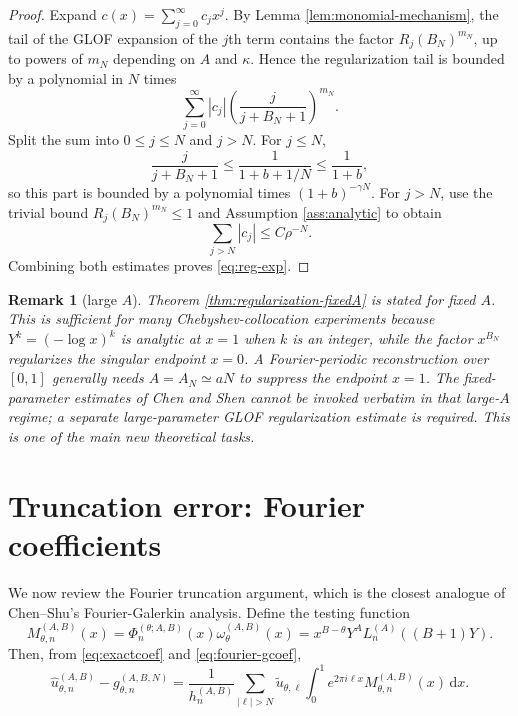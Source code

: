 \documentclass[11pt]{article}
\newtheorem{remark}{Remark}
\newcommand{\dd}{\,\mathrm{d}}
\newcommand{\Lag}{L}
\begin{document}
\begin{proof}
Expand $c(x)=\sum_{j=0}^\infty c_jx^j$.  By Lemma \ref{lem:monomial-mechanism}, the tail of the GLOF expansion of the $j$th term contains the factor $R_j(B_N)^{m_N}$, up to powers of $m_N$ depending on $A$ and $\kappa$.  Hence the regularization tail is bounded by a polynomial in $N$ times
\[
    \sum_{j=0}^\infty |c_j|\left(\frac{j}{j+B_N+1}\right)^{m_N}.
\]
Split the sum into $0\le j\le N$ and $j>N$.  For $j\le N$,
\[
    \frac{j}{j+B_N+1}\le \frac{1}{1+b+1/N}\le \frac{1}{1+b},
\]
so this part is bounded by a polynomial times $(1+b)^{-\gamma N}$.  For $j>N$, use the trivial bound $R_j(B_N)^{m_N}\le1$ and Assumption \ref{ass:analytic} to obtain
\[
    \sum_{j>N}|c_j|\le C\rho^{-N}.
\]
Combining both estimates proves \eqref{eq:reg-exp}.
\end{proof}

\begin{remark}[large $A$]
Theorem \ref{thm:regularization-fixedA} is stated for fixed $A$.  This is sufficient for many Chebyshev-collocation experiments because $Y^k=(-\log x)^k$ is analytic at $x=1$ when $k$ is an integer, while the factor $x^{B_N}$ regularizes the singular endpoint $x=0$.  A Fourier-periodic reconstruction over $[0,1]$ generally needs $A=A_N\simeq aN$ to suppress the endpoint $x=1$.  The fixed-parameter estimates of Chen and Shen cannot be invoked verbatim in that large-$A$ regime; a separate large-parameter GLOF regularization estimate is required.  This is one of the main new theoretical tasks.
\end{remark}

\section{Truncation error: Fourier coefficients}

We now review the Fourier truncation argument, which is the closest analogue of Chen--Shu's Fourier-Galerkin analysis.  Define the testing function
\begin{equation}\label{eq:Mtest}
    M_{\theta,n}^{(A,B)}(x)
    =\Phi_n^{(\theta;A,B)}(x)\omega_\theta^{(A,B)}(x)
    =x^{B-\theta}Y^A\Lag_n^{(A)}((B+1)Y).
\end{equation}
Then, from \eqref{eq:exactcoef} and \eqref{eq:fourier-gcoef},
\begin{equation}\label{eq:coefdiff-fourier}
    \widehat u_{\theta,n}^{(A,B)}-g_{\theta,n}^{(A,B,N)}
    =\frac{1}{h_n^{(A,B)}}
    \sum_{|\ell|>N}\widetilde u_{\theta,\ell}
    \int_0^1e^{2\pi i\ell x}M_{\theta,n}^{(A,B)}(x)\dd x.
\end{equation}
\end{document}
